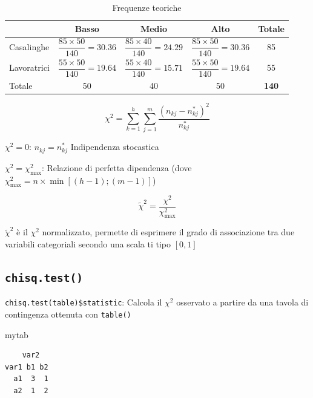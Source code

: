 \documentclass[
  a4paper,
  DIV=11,
  numbers=noendperiod]{scrreprt}
\newenvironment{Shaded}{\begin{snugshade}}{\end{snugshade}}
\newcommand{\NormalTok}[1]{#1}
\begin{document}
\begin{table}[h]
\centering
\caption{Frequenze teoriche}
\renewcommand{\arraystretch}{1.8}
\begin{tabular}{lccc|c}
\hline
& Basso & Medio & Alto & Totale \\
\hline

Casalinghe
& $\dfrac{85 \times 50}{140} = 30.36$
& $\dfrac{85 \times 40}{140} = 24.29$
& $\dfrac{85 \times 50}{140} = 30.36$
& 85 \\

Lavoratrici
& $\dfrac{55 \times 50}{140} = 19.64$
& $\dfrac{55 \times 40}{140} = 15.71$
& $\dfrac{55 \times 50}{140} = 19.64$
& 55 \\

\hline

Totale
& 50
& 40
& 50
& \textbf{140} \\

\hline
\end{tabular}
\end{table}

\[\chi^2 = \sum_{k=1}^{h} \sum_{j=1}^{m} \displaystyle \frac{(n_{kj} - n_{kj}^*)^2}{n_{kj}^*}\]

\(\chi^2 = 0\): \(n_{kj} = n_{kj}^*\) Indipendenza stocastica

\(\chi^2 = \chi_{\max}^2\): Relazione di perfetta dipendenza (dove
\(\chi_{\max}^2 = n \times \min[(h-1); (m-1)]\))

\[\tilde{\chi}^2 = \dfrac{\chi^2}{\chi_{\max}^2}\]

\(\tilde{\chi}^2\) è il \(\chi^2\) normalizzato, permette di esprimere
il grado di associazione tra due variabili categoriali secondo una scala
ti tipo \([0, 1]\)

\subsection{\texorpdfstring{\texttt{chisq.test()}}{chisq.test()}}\label{chisq.test}

\texttt{chisq.test(table)\$statistic}: Calcola il \(\chi^2\) osservato a
partire da una tavola di contingenza ottenuta con \texttt{table()}

\begin{Shaded}
\begin{Highlighting}[]
\NormalTok{mytab}
\end{Highlighting}
\end{Shaded}

\begin{verbatim}
    var2
var1 b1 b2
  a1  3  1
  a2  1  2
\end{verbatim}
\end{document}
